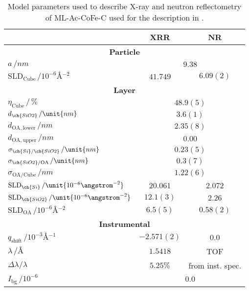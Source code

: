\documentclass[\main/dresen_thesis.tex]{subfiles}
\begin{document}
  \begin{table}[ht]
    \centering
    \caption{\label{tab:monolayers:structure:ML-Ac-CoFe-C-WithSpacer}Model parameters used to describe X-ray and neutron reflectometry of ML-Ac-CoFe-C used for the description in .}
    \begin{tabular}{l | c | c}
      \hline
      &
      \textbf{XRR} &
      \textbf{NR}\\
      \hline
      \multicolumn{3}{c}{\textbf{Particle}}\\
      \hline
      $a \, / \unit{nm}$ &
        \multicolumn{2}{c}{$9.38$} \\
      $\mathrm{SLD}_\mathrm{Cube} \, / \unit{10^{-6} \angstrom^{-2}}$ &
        $41.749$ &
        $6.09(2)$ \\
      \hline
      \multicolumn{3}{c}{\textbf{Layer}}\\
      \hline
      $\eta_\mathrm{Cube} \, /\, \%$ &
        \multicolumn{2}{c}{$48.9(5) $} \\
      $d_{\ch{SiO2}} \, / \unit{nm}$ &
        \multicolumn{2}{c}{$3.6(1)$} \\
      $d_{\mathrm{OA, lower}} \, / \unit{nm}$ &
        \multicolumn{2}{c}{$2.35(8)$} \\
      $d_{\mathrm{OA, upper}} \, / \unit{nm}$ &
        \multicolumn{2}{c}{$0.00$} \\
      $\sigma_{\ch{Si}/\ch{SiO2}} \, / \unit{nm}$ &
        \multicolumn{2}{c}{$0.23(5)$} \\
      $\sigma_{\ch{SiO2}/\mathrm{OA}}\, / \unit{nm}$ &
        \multicolumn{2}{c}{$0.3(7)$} \\
      $\sigma_\mathrm{OA/Cube} \, / \unit{nm}$ &
        \multicolumn{2}{c}{$1.22(6)$} \\
      $\mathrm{SLD}_{\ch{Si}} \, / \unit{10^{-6} \angstrom^{-2}}$ &
        $20.061$ &
        $2.072$ \\
      $\mathrm{SLD}_{\ch{SiO2}} \, / \unit{10^{-6} \angstrom^{-2}}$ &
        $12.1(3)$ &
        $2.26$ \\
      $\mathrm{SLD}_\mathrm{OA} \, / \unit{10^{-6} \angstrom^{-2}}$ &
        $6.5(5)$ &
        $0.58(2)$ \\
      \hline
      \multicolumn{3}{c}{\textbf{Instrumental}}\\
      \hline
      $q_\mathrm{shift} \,/ \unit{10^{-3} \angstrom^{-1}}$ &
        $-2.571(2)$ &
        $0.0$\\
      $\lambda \, / \unit{\angstrom}$ &
        $1.5418$&
        TOF\\
      $\Delta \lambda / \lambda$ &
        $5.25 \%$ &
        from inst. spec.\\
      $I_\mathrm{bg}\,/\unit{10^{-6}}$ &
        \multicolumn{2}{c}{$0.0$} \\
      \hline
    \end{tabular}
  \end{table}
\end{document}
